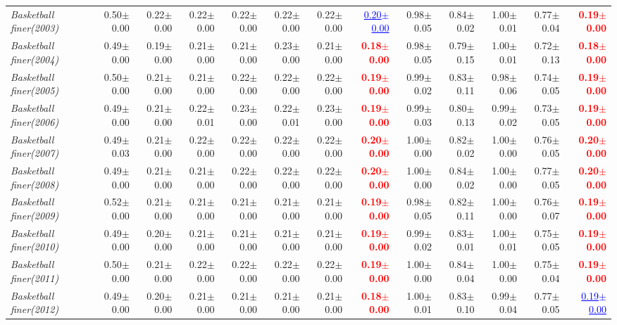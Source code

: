 \documentclass[nohyperref]{article}
\theoremstyle{plain}
\theoremstyle{definition}
\theoremstyle{remark}
\newcommand{\red}[1]{\textcolor{red}{\textbf{#1}}}
\newcommand{\blue}[1]{\textcolor{blue}{\underline{#1}}}
\begin{document}
\begin{table*}[!ht]
{\begin{tabular}{lrr|rrrrr|rrrrr}
			{\it Basketball finer(2003)} & 0.50$\pm$0.00 & 0.22$\pm$0.00 & 0.22$\pm$0.00 & 0.22$\pm$0.00 & 0.22$\pm$0.00 & 0.22$\pm$0.00 & \blue{0.20$\pm$0.00} & 0.98$\pm$0.05 & 0.84$\pm$0.02 & 1.00$\pm$0.01 & 0.77$\pm$0.04 & \red{0.19$\pm$0.00} \\
			{\it Basketball finer(2004)} & 0.49$\pm$0.00 & 0.19$\pm$0.00 & 0.21$\pm$0.00 & 0.21$\pm$0.00 & 0.23$\pm$0.00 & 0.21$\pm$0.00 & \red{0.18$\pm$0.00} & 0.98$\pm$0.05 & 0.79$\pm$0.15 & 1.00$\pm$0.01 & 0.72$\pm$0.13 & \red{0.18$\pm$0.00} \\
			{\it Basketball finer(2005)} & 0.50$\pm$0.00 & 0.21$\pm$0.00 & 0.21$\pm$0.00 & 0.22$\pm$0.00 & 0.22$\pm$0.00 & 0.22$\pm$0.00 & \red{0.19$\pm$0.00} & 0.99$\pm$0.02 & 0.83$\pm$0.11 & 0.98$\pm$0.06 & 0.74$\pm$0.05 & \red{0.19$\pm$0.00} \\
			{\it Basketball finer(2006)} & 0.49$\pm$0.00 & 0.21$\pm$0.00 & 0.22$\pm$0.01 & 0.23$\pm$0.00 & 0.22$\pm$0.01 & 0.23$\pm$0.00 & \red{0.19$\pm$0.00} & 0.99$\pm$0.03 & 0.80$\pm$0.13 & 0.99$\pm$0.02 & 0.73$\pm$0.05 & \red{0.19$\pm$0.00} \\
			{\it Basketball finer(2007)} & 0.49$\pm$0.03 & 0.21$\pm$0.00 & 0.22$\pm$0.00 & 0.22$\pm$0.00 & 0.22$\pm$0.00 & 0.22$\pm$0.00 & \red{0.20$\pm$0.00} & 1.00$\pm$0.00 & 0.82$\pm$0.02 & 1.00$\pm$0.00 & 0.76$\pm$0.05 & \red{0.20$\pm$0.00} \\
			{\it Basketball finer(2008)} & 0.49$\pm$0.00 & 0.21$\pm$0.00 & 0.21$\pm$0.00 & 0.22$\pm$0.00 & 0.22$\pm$0.00 & 0.22$\pm$0.00 & \red{0.20$\pm$0.00} & 1.00$\pm$0.00 & 0.84$\pm$0.02 & 1.00$\pm$0.00 & 0.77$\pm$0.05 & \red{0.20$\pm$0.00} \\
			{\it Basketball finer(2009)} & 0.52$\pm$0.00 & 0.21$\pm$0.00 & 0.21$\pm$0.00 & 0.21$\pm$0.00 & 0.21$\pm$0.00 & 0.21$\pm$0.00 & \red{0.19$\pm$0.00} & 0.98$\pm$0.05 & 0.82$\pm$0.11 & 1.00$\pm$0.00 & 0.76$\pm$0.07 & \red{0.19$\pm$0.00} \\
			{\it Basketball finer(2010)} & 0.49$\pm$0.00 & 0.20$\pm$0.00 & 0.21$\pm$0.00 & 0.21$\pm$0.00 & 0.21$\pm$0.00 & 0.21$\pm$0.00 & \red{0.19$\pm$0.00} & 0.99$\pm$0.02 & 0.83$\pm$0.01 & 1.00$\pm$0.01 & 0.75$\pm$0.05 & \red{0.19$\pm$0.00} \\
			{\it Basketball finer(2011)} & 0.50$\pm$0.00 & 0.21$\pm$0.00 & 0.22$\pm$0.00 & 0.22$\pm$0.00 & 0.22$\pm$0.00 & 0.22$\pm$0.00 & \red{0.19$\pm$0.00} & 1.00$\pm$0.00 & 0.84$\pm$0.04 & 1.00$\pm$0.00 & 0.75$\pm$0.04 & \red{0.19$\pm$0.00} \\
			{\it Basketball finer(2012)} & 0.49$\pm$0.00 & 0.20$\pm$0.00 & 0.21$\pm$0.00 & 0.21$\pm$0.00 & 0.21$\pm$0.00 & 0.21$\pm$0.00 & \red{0.18$\pm$0.00} & 1.00$\pm$0.01 & 0.83$\pm$0.10 & 0.99$\pm$0.04 & 0.77$\pm$0.05 & \blue{0.19$\pm$0.00} \\

\end{tabular}}
\end{table*}
\end{document}
